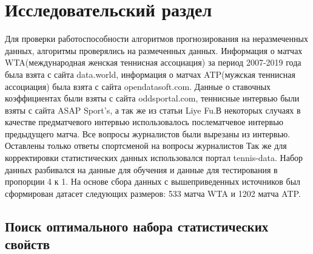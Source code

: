 \chapter{Исследовательский раздел}
Для проверки работоспособности алгоритмов прогнозирования на неразмеченных данных, алгоритмы проверялись на размеченных данных.
Информация о матчах WTA(международная женская теннисная ассоциация) за период 2007-2019 года была взята с сайта data.world\cite{Book34}, информация о матчах ATP(мужская теннисная ассоциация) была взята с сайта opendatasoft.com\cite{Book35}.
Данные о ставочных коэффициентах были взяты с сайта oddsportal.com\cite{Book36}, теннисные интервью были взяты с сайта  ASAP
Sport’s\cite{Book37}, а так же из статьи Liye Fu\cite{Book38}.В некоторых случаях в качестве предматчевого интервью использовалось послематчевое интервью предыдущего матча. Все вопросы журналистов были вырезаны из интервью. Оставлены только ответы спортсменой на вопросы журналистов Так же для корректировки статистических данных использовался портал tennis-data\cite{Book39}. Набор данных разбивался на данные для обучения и данные для тестирования в пропорции 4 к 1.
На основе сбора данных с вышеприведенных источников был сформирован датасет следующих размеров: 533 матча WTA и 1202 матча ATP.
\section{Поиск оптимального набора статистических свойств}

